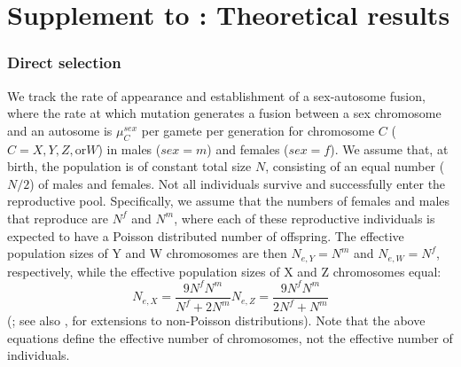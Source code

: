 \chapter{Supplement to : Theoretical results}

\subsection{Direct selection}

We track the rate of appearance and establishment of a sex-autosome fusion, where the rate at which mutation generates a fusion between a sex chromosome and an autosome is $\mu^{sex}_C$ per gamete per generation for chromosome $C$ ($C = X, Y, Z, \text{or} W$) in males ($sex = m$) and females ($sex = f$). We assume that, at birth, the population is of constant total size $N$, consisting of an equal number ($N/\text{2}$) of males and females. Not all individuals survive and successfully enter the reproductive pool. Specifically, we assume that the numbers of females and males that reproduce are $N^f$ and $N^m$, where each of these reproductive individuals is expected to have a Poisson distributed number of offspring. The effective population sizes of Y and W chromosomes are then $N_{e,Y}=N^m$ and $N_{e,W}=N^f$, respectively, while the effective population sizes of X and Z chromosomes equal:
\begin{subequations}\label{eq:a1}
\begin{equation}
N_{e,X} = \frac{\text{9}N^fN^m}{N^f + \text{2}N^m}
\end{equation}
\begin{equation}
N_{e,Z} = \frac{\text{9}N^fN^m}{\text{2}N^f + N^m}
\end{equation}
\end{subequations}
(\citealt{Wright1933}; see also \citealt{Caballero1995}, for extensions to non-Poisson distributions). Note that the above equations define the effective number of chromosomes, not the effective number of individuals.

